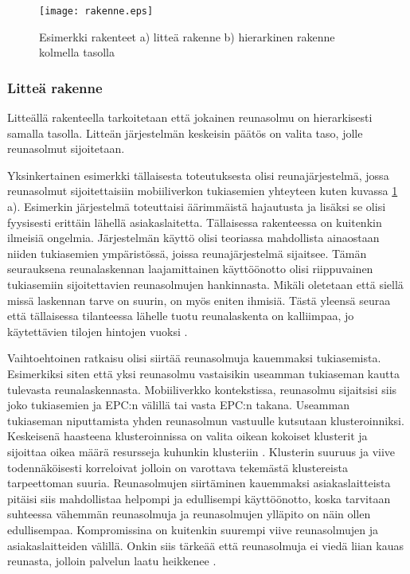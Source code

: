 \begin{figure}[tb]
\texttt{[image: rakenne.eps]}
\caption{Esimerkki rakenteet a) litteä rakenne b) hierarkinen rakenne kolmella tasolla} \label{fig:rakenne}
\end{figure}

\subsubsection{Litteä rakenne}
Litteällä rakenteella tarkoitetaan että jokainen reunasolmu on hierarkisesti samalla tasolla. Litteän järjestelmän keskeisin päätös on valita taso, jolle reunasolmut sijoitetaan. 

Yksinkertainen esimerkki tällaisesta toteutuksesta olisi reunajärjestelmä, jossa reunasolmut sijoitettaisiin mobiiliverkon tukiasemien yhteyteen kuten kuvassa \ref{fig:rakenne} a). Esimerkin järjestelmä  toteuttaisi äärimmäistä hajautusta ja lisäksi se olisi fyysisesti erittäin lähellä asiakaslaitetta. Tällaisessa rakenteessa on kuitenkin ilmeisiä ongelmia. Järjestelmän käyttö olisi teoriassa mahdollista ainaostaan niiden tukiasemien ympäristössä, joissa reunajärjestelmä sijaitsee. Tämän seurauksena reunalaskennan laajamittainen käyttöönotto olisi riippuvainen tukiasemiin sijoitettavien reunasolmujen hankinnasta. Mikäli oletetaan että siellä missä laskennan tarve on suurin, on myös eniten ihmisiä. Tästä yleensä seuraa että tällaisessa tilanteessa lähelle tuotu reunalaskenta on kalliimpaa, jo käytettävien tilojen hintojen vuoksi \cite{mao17}.

Vaihtoehtoinen ratkaisu olisi siirtää reunasolmuja kauemmaksi tukiasemista. Esimerkiksi siten että yksi reunasolmu vastaisikin useamman tukiaseman kautta tulevasta reunalaskennasta. Mobiiliverkko kontekstissa, reunasolmu sijaitsisi siis joko tukiasemien ja EPC:n välillä tai vasta EPC:n takana.  
Useamman tukiaseman niputtamista yhden reunasolmun vastuulle kutsutaan klusteroinniksi. 
Keskeisenä haasteena klusteroinnissa on valita oikean kokoiset klusterit ja sijoittaa oikea määrä resursseja kuhunkin klusteriin \cite{malandrino2016close}.
Klusterin suuruus ja viive todennäköisesti korreloivat jolloin on varottava tekemästä klustereista tarpeettoman suuria.
Reunasolmujen siirtäminen kauemmaksi asiakaslaitteista pitäisi siis mahdollistaa helpompi ja edullisempi käyttöönotto, koska tarvitaan suhteessa vähemmän reunasolmuja ja reunasolmujen ylläpito on näin ollen edullisempaa.
Kompromissina on kuitenkin suurempi viive reunasolmujen ja asiakaslaitteiden välillä. 
Onkin siis tärkeää että reunasolmuja ei viedä liian kauas reunasta, jolloin palvelun laatu heikkenee \cite{mao17}. 



